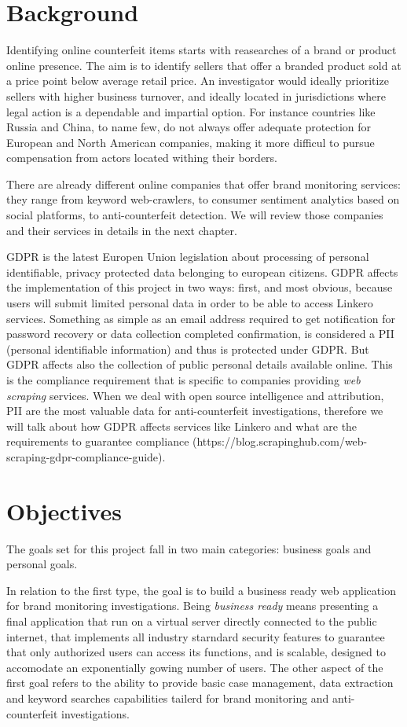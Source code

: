 \section{Background}
Identifying online counterfeit items starts with reasearches of a brand or
product online presence. The aim is to identify sellers that offer a branded
product sold at a price point below average retail price. An investigator would
ideally prioritize sellers with higher business turnover, and ideally located in
jurisdictions where legal action is a dependable and impartial option. For
instance countries like Russia and China, to name few, do not always offer
adequate protection for European and North American companies, making it more difficul to pursue
compensation from actors located withing their borders.

There are already different online companies that offer brand monitoring
services: they range from keyword web-crawlers, to consumer sentiment analytics
based on social platforms, to anti-counterfeit detection. We will review those
companies and their services in details in the next chapter.

GDPR is the latest Europen Union legislation about processing of personal
identifiable, privacy protected data belonging to european citizens. GDPR
affects the implementation of this project in two ways: first, and most obvious,
because users will submit limited personal data in order to be able to access
Linkero services. Something as simple as an email address required to get
notification for password recovery or data collection completed confirmation, is
considered a PII (personal identifiable information) and thus is protected under
GDPR. But GDPR affects also the collection of public personal details available
online. This is the compliance requirement that is specific to companies
providing \emph{web scraping} services. When we deal with open source
intelligence and attribution, PII are the most valuable data for
anti-counterfeit investigations, therefore we will talk about how GDPR affects
services like Linkero and what are the requirements to guarantee compliance
(https://blog.scrapinghub.com/web-scraping-gdpr-compliance-guide).


\section{Objectives}
The goals set for this project fall in two main categories: business goals and
personal goals.

In relation to the first type, the goal is to build a business ready web
application for brand monitoring investigations. Being \emph{business ready}
means presenting a final application that run on a virtual server directly
connected to the public internet, that implements all industry starndard
security features to guarantee that only authorized users can access its
functions, and is scalable, designed to accomodate an exponentially gowing
number of users. The other aspect of the first goal refers to the ability to
provide basic case management, data extraction and keyword searches capabilities
tailerd for brand monitoring and anti-counterfeit investigations.

